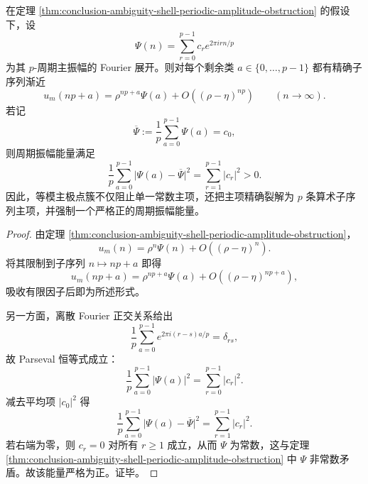 \begin{theorem}[周期振幅的剩余类分裂与正能量律]\label{thm:conclusion-periodic-amplitude-residue-energy-splitting}
在定理 \ref{thm:conclusion-ambiguity-shell-periodic-amplitude-obstruction} 的假设下，设
\[
\Psi(n)=\sum_{r=0}^{p-1} c_r e^{2\pi i rn/p}
\]
为其 \(p\)-周期主振幅的 Fourier 展开。则对每个剩余类 \(a\in\{0,\dots,p-1\}\) 都有精确子序列渐近
\[
u_m(np+a)=\rho^{np+a}\Psi(a)+O((\rho-\eta)^{np})
\qquad(n\to\infty).
\]
若记
\[
\overline\Psi:=\frac1p\sum_{a=0}^{p-1}\Psi(a)=c_0,
\]
则周期振幅能量满足
\[
\frac1p\sum_{a=0}^{p-1}\bigl|\Psi(a)-\overline\Psi\bigr|^2
=
\sum_{r=1}^{p-1}|c_r|^2
>0.
\]
因此，等模主极点簇不仅阻止单一常数主项，还把主项精确裂解为 \(p\) 条算术子序列主项，并强制一个严格正的周期振幅能量。
\end{theorem}
\begin{proof}
由定理 \ref{thm:conclusion-ambiguity-shell-periodic-amplitude-obstruction}，
\[
u_m(n)=\rho^n\Psi(n)+O((\rho-\eta)^n).
\]
将其限制到子序列 \(n\mapsto np+a\) 即得
\[
u_m(np+a)=\rho^{np+a}\Psi(a)+O((\rho-\eta)^{np+a}),
\]
吸收有限因子后即为所述形式。

另一方面，离散 Fourier 正交关系给出
\[
\frac1p\sum_{a=0}^{p-1}e^{2\pi i(r-s)a/p}=\delta_{rs},
\]
故 Parseval 恒等式成立：
\[
\frac1p\sum_{a=0}^{p-1}|\Psi(a)|^2=\sum_{r=0}^{p-1}|c_r|^2.
\]
减去平均项 \(|c_0|^2\) 得
\[
\frac1p\sum_{a=0}^{p-1}\bigl|\Psi(a)-\overline\Psi\bigr|^2
=
\sum_{r=1}^{p-1}|c_r|^2.
\]
若右端为零，则 \(c_r=0\) 对所有 \(r\ge 1\) 成立，从而 \(\Psi\) 为常数，这与定理 \ref{thm:conclusion-ambiguity-shell-periodic-amplitude-obstruction} 中 \(\Psi\) 非常数矛盾。故该能量严格为正。证毕。
\end{proof}

